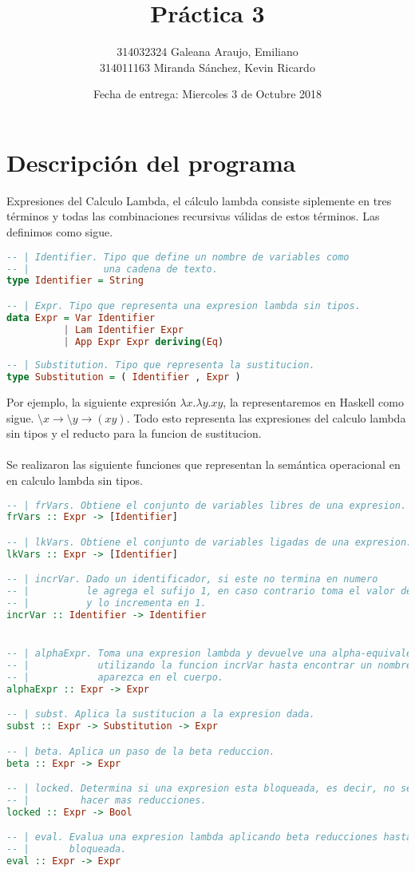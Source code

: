 \documentclass{article}
\title{Práctica 3}
\author{314032324	Galeana Araujo, Emiliano\\
	314011163	Miranda Sánchez, Kevin Ricardo}
\affil{Facultad de Ciencias, UNAM}
\date{Fecha de entrega: Miercoles 3 de Octubre 2018}
\begin{document}
\maketitle

\section{Descripción del programa}
Expresiones del Calculo Lambda, el cálculo lambda consiste siplemente en tres
términos y todas las combinaciones recursivas válidas de estos términos. Las
definimos como sigue.
\begin{lstlisting}[language=Haskell]
-- | Identifier. Tipo que define un nombre de variables como 
-- |             una cadena de texto.
type Identifier = String

-- | Expr. Tipo que representa una expresion lambda sin tipos.
data Expr = Var Identifier
          | Lam Identifier Expr
          | App Expr Expr deriving(Eq)
           
-- | Substitution. Tipo que representa la sustitucion.
type Substitution = ( Identifier , Expr )
\end{lstlisting}
Por ejemplo, la siguiente expresión $\lambda x. \lambda y. xy$, la
representaremos en Haskell como sigue. $\setminus x \rightarrow \setminus y
\rightarrow (x y)$. Todo esto representa las expresiones del calculo lambda sin
tipos y el reducto para la funcion de sustitucion.\\
\\Se realizaron las siguiente funciones que representan la semántica operacional
en en calculo lambda sin tipos.

\begin{lstlisting}[language=Haskell]
-- | frVars. Obtiene el conjunto de variables libres de una expresion.
frVars :: Expr -> [Identifier]

-- | lkVars. Obtiene el conjunto de variables ligadas de una expresion.
lkVars :: Expr -> [Identifier]

-- | incrVar. Dado un identificador, si este no termina en numero
-- |          le agrega el sufijo 1, en caso contrario toma el valor del numero
-- |          y lo incrementa en 1.
incrVar :: Identifier -> Identifier


-- | alphaExpr. Toma una expresion lambda y devuelve una alpha-equivalente 
-- |            utilizando la funcion incrVar hasta encontrar un nombre que no
-- |            aparezca en el cuerpo.
alphaExpr :: Expr -> Expr

-- | subst. Aplica la sustitucion a la expresion dada.
subst :: Expr -> Substitution -> Expr

-- | beta. Aplica un paso de la beta reduccion.
beta :: Expr -> Expr

-- | locked. Determina si una expresion esta bloqueada, es decir, no se pueden
-- |         hacer mas reducciones.
locked :: Expr -> Bool

-- | eval. Evalua una expresion lambda aplicando beta reducciones hasta quedar
-- |       bloqueada.
eval :: Expr -> Expr

\end{lstlisting}
\end{document}
